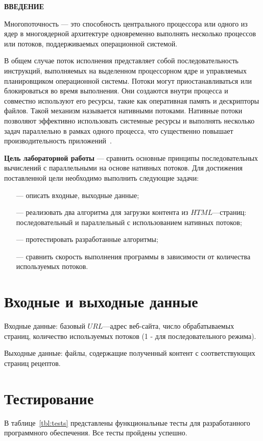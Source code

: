 \begin{center}
    \textbf{ВВЕДЕНИЕ}
\end{center}

Многопоточность — это способность центрального процессора или одного из ядер в многоядерной архитектуре одновременно выполнять несколько процессов или потоков, поддерживаемых операционной системой.

В общем случае поток исполнения представляет собой последовательность инструкций, выполняемых на выделенном процессорном ядре и управляемых планировщиком операционной системы. Потоки могут приостанавливаться или блокироваться во время выполнения. Они создаются внутри процесса и совместно используют его ресурсы, такие как оперативная память и дескрипторы файлов. Такой механизм называется нативными потоками. Нативные потоки позволяют эффективно использовать системные ресурсы и выполнять несколько задач параллельно в рамках одного процесса, что существенно повышает производительность приложений~\cite{threads}.

\textbf{Цель лабораторной работы} --- сравнить основные принципы последовательных вычислений с параллельными на основе нативных потоков. Для достижения поставленной цели необходимо выполнить следующие задачи:

\begin{itemize}
    \item[---] описать входные, выходные данные;
    \item[---] реализовать два алгоритма для загрузки контента из $HTML$---страниц: последовательный и параллельный с использованием нативных потоков;
    \item[---] протестировать разработанные алгоритмы;
    \item[---] сравнить скорость выполнения программы в зависимости от количества используемых потоков.
\end{itemize}


\chapter{Входные и выходные данные}

Входные данные: базовый $URL$---адрес веб-сайта, число обрабатываемых страниц, количество используемых потоков (1 - для последовательного режима).

Выходные данные: файлы, содержащие полученный контент с соответствующих страниц рецептов.


\chapter{Тестирование}
В таблице~\ref{tbl:tests} представлены функциональные тесты для разработанного
программного обеспечения. Все тесты пройдены успешно.

